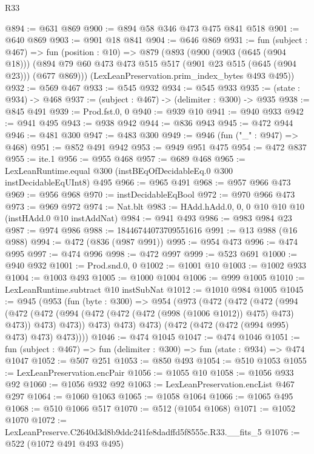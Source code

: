 \begin{lexlean}{R33}
\begin{coremodule}
@894 := @631 @869
@900 := @894 @58 @346 @473 @475 @841 @518
@901 := @640 @869
@903 := @901 @18 @841
@904 := @646 @869
@931 := fun (subject : @467) =>
  fun (position : @10) =>
  @879
    (@893
      (@900
        (@903 (@645 (@904 @18)))
        (@894 @79 @60 @473 @473 @515 @517 (@901 @23 @515 (@645 (@904 @23))) (@677 @869)))
      (LexLeanPreservation.prim_index_bytes @493 @495))
@932 := @569 @467
@933 := @545 @932
@934 := @545 @933
@935 := (state : @934) -> @468
@937 := (subject : @467) -> (delimiter : @300) -> @935
@938 := @845 @491
@939 := Prod.fst.{0, 0}
@940 := @939 @10
@941 := @940 @933
@942 := @941 @495
@943 := @938 @942
@944 := @836 @943
@945 := @472 @944
@946 := @481 @300
@947 := @483 @300
@949 := @946 (fun ("_" : @947) => @468)
@951 := @852 @491 @942
@953 := @949 @951 @475
@954 := @472 @837
@955 := ite.{1}
@956 := @955 @468
@957 := @689 @468
@965 := LexLeanRuntime.equal @300 (instBEqOfDecidableEq.{0} @300 instDecidableEqUInt8) @495
@966 := @965 @491
@968 := @957 @966 @473
@969 := @956 @968
@970 := instDecidableEqBool
@972 := @970 @966 @473
@973 := @969 @972
@974 := Nat.blt
@983 := HAdd.hAdd.{0, 0, 0} @10 @10 @10 (instHAdd.{0} @10 instAddNat)
@984 := @941 @493
@986 := @983 @984 @23
@987 := @974 @986
@988 := 18446744073709551616
@991 := @13 @988 (@16 @988)
@994 := @472 (@836 (@987 @991))
@995 := @954 @473
@996 := @474 @995
@997 := @474 @996
@998 := @472 @997
@999 := @523 @691
@1000 := @940 @932
@1001 := Prod.snd.{0, 0}
@1002 := @1001 @10
@1003 := @1002 @933
@1004 := @1003 @493
@1005 := @1000 @1004
@1006 := @999 @1005
@1010 := LexLeanRuntime.subtract @10 instSubNat
@1012 := @1010 @984 @1005
@1045 := @945
    (@953
      (fun (byte : @300) =>
      @954
        (@973
          (@472
            (@472
              (@472
                (@994
                  (@472
                    (@472 (@994 (@472 (@472 (@472 (@998 (@1006 @1012)) @475) @473) @473)) @473)
                    @473))
                @473)
              @473)
            @473)
          (@472 (@472 (@472 (@994 @995) @473) @473) @473))))
@1046 := @474 @1045
@1047 := @474 @1046
@1051 := fun (subject : @467) => fun (delimiter : @300) => fun (state : @934) => @474 @1047
@1052 := @507 @251
@1053 := @850 @493
@1054 := @510 @1053
@1055 := LexLeanPreservation.encPair
@1056 := @1055 @10
@1058 := @1056 @933 @92
@1060 := @1056 @932 @92
@1063 := LexLeanPreservation.encList @467 @297
@1064 := @1060 @1063
@1065 := @1058 @1064
@1066 := @1065 @495
@1068 := @510 @1066 @517
@1070 := @512 (@1054 @1068)
@1071 := @1052 @1070
@1072 := LexLeanPreserve.C2640d3d8b9ddc241fe8dadffd5f8555c.R33.__fits_5
@1076 := @522 (@1072 @491 @493 @495)

\end{coremodule}
\end{lexlean}
